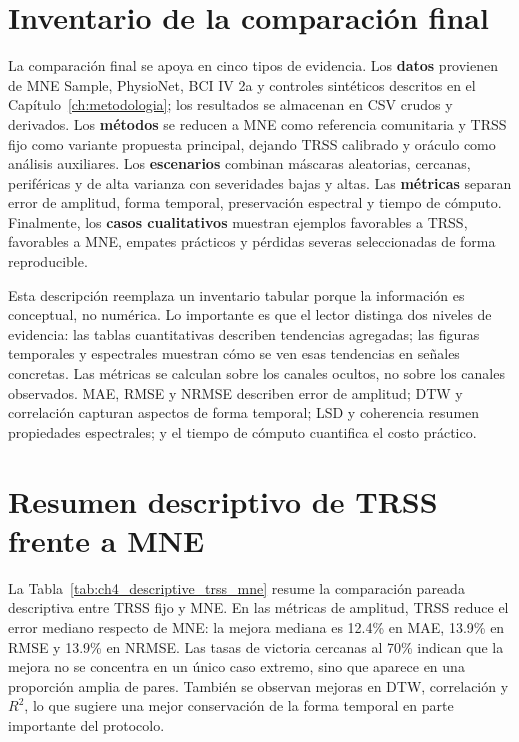 \section{Inventario de la comparación final}

La comparación final se apoya en cinco tipos de evidencia. Los \textbf{datos} provienen de MNE Sample, PhysioNet, BCI IV 2a y controles sintéticos descritos en el Capítulo~\ref{ch:metodologia}; los resultados se almacenan en CSV crudos y derivados. Los \textbf{métodos} se reducen a MNE como referencia comunitaria y TRSS fijo como variante propuesta principal, dejando TRSS calibrado y oráculo como análisis auxiliares. Los \textbf{escenarios} combinan máscaras aleatorias, cercanas, periféricas y de alta varianza con severidades bajas y altas. Las \textbf{métricas} separan error de amplitud, forma temporal, preservación espectral y tiempo de cómputo. Finalmente, los \textbf{casos cualitativos} muestran ejemplos favorables a TRSS, favorables a MNE, empates prácticos y pérdidas severas seleccionadas de forma reproducible.

Esta descripción reemplaza un inventario tabular porque la información es conceptual, no numérica. Lo importante es que el lector distinga dos niveles de evidencia: las tablas cuantitativas describen tendencias agregadas; las figuras temporales y espectrales muestran cómo se ven esas tendencias en señales concretas. Las métricas se calculan sobre los canales ocultos, no sobre los canales observados. MAE, RMSE y NRMSE describen error de amplitud; DTW y correlación capturan aspectos de forma temporal; LSD y coherencia resumen propiedades espectrales; y el tiempo de cómputo cuantifica el costo práctico.

\section{Resumen descriptivo de TRSS frente a MNE}

La Tabla~\ref{tab:ch4_descriptive_trss_mne} resume la comparación pareada descriptiva entre TRSS fijo y MNE. En las métricas de amplitud, TRSS reduce el error mediano respecto de MNE: la mejora mediana es 12.4\% en MAE, 13.9\% en RMSE y 13.9\% en NRMSE. Las tasas de victoria cercanas al 70\% indican que la mejora no se concentra en un único caso extremo, sino que aparece en una proporción amplia de pares. También se observan mejoras en DTW, correlación y $R^2$, lo que sugiere una mejor conservación de la forma temporal en parte importante del protocolo.

